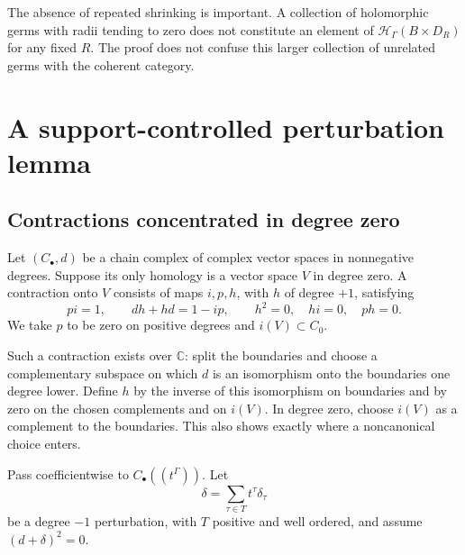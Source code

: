 \documentclass[11pt,letterpaper]{article}
\theoremstyle{definition}
\theoremstyle{remark}
\newcommand{\C}{\mathbb C}
\newcommand{\HH}{\mathcal H}
\newcommand{\Hh}{\HH_{\Gamma}}
\begin{document}
The absence of repeated shrinking is important. A collection of holomorphic germs with radii tending to zero does not constitute an element of $\Hh(B\times D_R)$ for any fixed $R$. The proof does not confuse this larger collection of unrelated germs with the coherent category.

\section{A support-controlled perturbation lemma}
\label{sec:perturbation}

\subsection{Contractions concentrated in degree zero}
Let $(C_\bullet,d)$ be a chain complex of complex vector spaces in nonnegative degrees. Suppose its only homology is a vector space $V$ in degree zero. A contraction onto $V$ consists of maps $i,p,h$, with $h$ of degree $+1$, satisfying
\begin{equation}\label{eq:contraction}
 pi=1,\qquad dh+hd=1-ip,\qquad h^2=0,\quad hi=0,\quad ph=0.
\end{equation}
We take $p$ to be zero on positive degrees and $i(V)\subset C_0$.

Such a contraction exists over $\C$: split the boundaries and choose a complementary subspace on which $d$ is an isomorphism onto the boundaries one degree lower. Define $h$ by the inverse of this isomorphism on boundaries and by zero on the chosen complements and on $i(V)$. In degree zero, choose $i(V)$ as a complement to the boundaries. This also shows exactly where a noncanonical choice enters.

Pass coefficientwise to $C_\bullet((t^\Gamma))$. Let
\[
 \delta=\sum_{\tau\in T}t^\tau\delta_\tau
\]
be a degree $-1$ perturbation, with $T$ positive and well ordered, and assume $(d+\delta)^2=0$.
\end{document}
